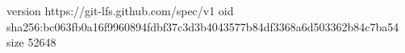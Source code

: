 version https://git-lfs.github.com/spec/v1
oid sha256:bc063fb0a16f9960894fdbf37c3d3b4043577b84df3368a6d503362b84c7ba54
size 52648
